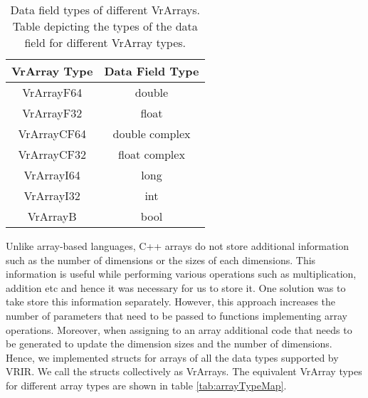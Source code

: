 \begin{table}[htbp]
\centering
\begin{tabular}{|c|c|}
\hline
VrArray Type & Data Field Type \\ \hline
VrArrayF64   & double          \\ \hline
VrArrayF32   & float           \\ \hline
VrArrayCF64  & double complex  \\ \hline
VrArrayCF32  & float complex  \\ \hline
VrArrayI64   & long            \\ \hline
VrArrayI32   & int             \\ \hline
VrArrayB     & bool            \\ \hline
\end{tabular}
\caption[Data field types of different VrArrays]{Data field types of different VrArrays. Table depicting the types of the data field for different VrArray types.}
\label{tab:arrayDataMap}
\end{table}
Unlike array-based languages, C++ arrays do not store additional information such as the number of dimensions or the sizes of each dimensions. This information is useful while performing various operations such as multiplication, addition etc and hence it was necessary for us to store it. One solution was to take store this information separately. However, this approach increases the number of parameters that need to be passed to functions implementing array operations. Moreover, when assigning to an array additional code that needs to be generated to update the dimension sizes and the number of dimensions. Hence, we implemented structs for arrays of all the data types supported by VRIR. We call the structs collectively as VrArrays. The equivalent VrArray types for different array types are shown in table \ref{tab:arrayTypeMap}.
